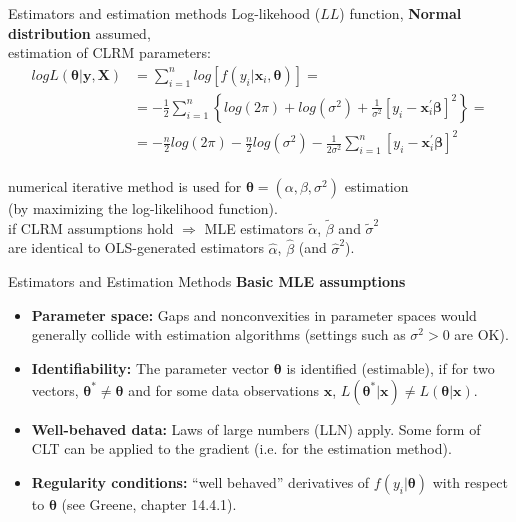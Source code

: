 \documentclass{beamer}
\begin{document}
\begin{frame}{Estimators and estimation methods}
Log-likehood ($LL$) function, \textbf{Normal distribution} assumed,\\
estimation of CLRM parameters:\\
\begin{align*}
log L(\bm{\theta}|\bm{y}, \bm{X} ) & =\sum_{i=1}^n log[f(y_i|\bm{x}_i, \bm{\theta})] = \\
& = -\frac{1}{2} \sum_{i=1}^n \left\lbrace { log(2\pi) + log(\sigma^2)+\frac{1}{\sigma^2}[y_i-\bm{x}_i^{\prime}\bm{\beta}]^2} \right\rbrace = \\ 
& = -\frac{n}{2}log(2\pi)-\frac{n}{2}log(\sigma^2)-\frac{1}{2\sigma^2} \sum_{i=1}^n [y_i-\bm{x}_i^{\prime}\bm{\beta}]^2
\end{align*}
\\ \bigskip
numerical iterative method is used for $\bm{\theta}=(\alpha, \beta, \sigma^2)$ estimation\\
(by maximizing the log-likelihood function).\\
if CLRM assumptions hold $\Rightarrow$ MLE estimators $\tilde{\alpha}$, $\tilde{\beta}$ and $\tilde{\sigma}^2$\\ are identical to OLS-generated estimators $\hat{\alpha}$, $\hat{\beta}$ (and $\hat{\sigma}^2$).
\end{frame}
\begin{frame}{Estimators and Estimation Methods}
\textbf{Basic MLE assumptions}\\
\begin{itemize}
    \item \textbf{Parameter space:} Gaps and nonconvexities in parameter spaces would generally collide with estimation algorithms (settings such as $\sigma^2 > 0$ are OK).
    \item \textbf{Identifiability:} The parameter vector $\bm{\theta}$ is identified (estimable), if for two vectors, $\bm{\theta}^{*} \neq \bm{\theta}$ and for some data observations $\bm{x}$, $L(\bm{\theta}^{*}|\bm{x}) \neq L(\bm{\theta}|\bm{x})$.
    \item \textbf{Well-behaved data:} Laws of large numbers (LLN) apply. Some form of CLT can be applied to the gradient (i.e. for the estimation method).
    \item \textbf{Regularity conditions:} ``well behaved'' derivatives of $f(y_i|\bm{\theta})$ with respect to $\bm{\theta}$ (see Greene, chapter 14.4.1).
\end{itemize}
\end{frame}
\end{document}
